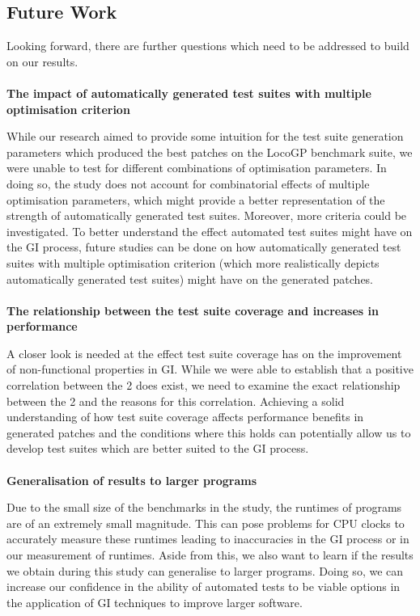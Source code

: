 \documentclass[titlepage]{article}
\begin{document}
\subsection{Future Work}
Looking forward, there are further questions which need to be addressed to build on our results. \\\\
\textbf{The impact of automatically generated test suites with multiple optimisation criterion}

While our research aimed to provide some intuition for the test suite generation parameters which produced the best patches on the LocoGP benchmark suite, we were unable to test for different combinations of optimisation parameters. In doing so, the study does not account for combinatorial effects of multiple optimisation parameters, which might provide a better representation of the strength of automatically generated test suites. Moreover, more criteria could be investigated. To better understand the effect automated test suites might have on the GI process, future studies can be done on  how automatically generated test suites with multiple optimisation criterion (which more realistically depicts automatically generated test suites) might have on the generated patches.\\\\
\textbf{The relationship between the test suite coverage and increases in performance}

A closer look is needed at the effect test suite coverage has on the improvement of non-functional properties in GI. While we were able to establish that a positive correlation between the 2 does exist, we need to examine the exact relationship between the 2 and the reasons for this correlation. Achieving a solid understanding of how test suite coverage affects performance benefits in generated patches and the conditions where this holds can potentially allow us to develop test suites which are better suited to the GI process. \\\\
\textbf{Generalisation of results to larger programs}

Due to the small size of the benchmarks in the study, the runtimes of programs are of an extremely small magnitude. This can pose problems for CPU clocks to accurately measure these runtimes leading to inaccuracies in the GI process or in our measurement of runtimes. Aside from this, we also want to learn if the results we obtain during this study can generalise to larger programs. Doing so, we can increase our confidence in the ability of automated tests to be viable options in the application of GI techniques to  improve larger software.
\end{document}
